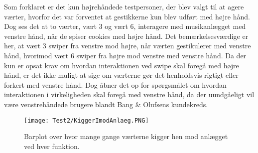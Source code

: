 Som forklaret er det kun højrehåndede testpersoner, der blev valgt til at agere værter, hvorfor det var forventet at gestikkerne kun blev udført med højre hånd. Dog ses det at to værter, vært 3 og vært 6, interagere med musikanlægget med venstre hånd, når de spiser cookies med højre hånd. Det bemærkelsesværdige er her, at vært 3 swiper fra venstre mod højre, når værten gestikulerer med venstre hånd, hvorimod vært 6 swiper fra højre mod venstre med venstre hånd. Da der kun er opsat krav om hvordan interaktionen ved swipe skal foregå med højre hånd, er det ikke muligt at sige om værterne gør det henholdsvis rigtigt eller forkert med venstre hånd. Dog åbner det op for spørgsmålet om hvordan interaktionen i virkeligheden skal foregå med venstre hånd, da der uundgåeligt vil være venstrehåndede brugere blandt Bang $\&$ Olufsens kundekreds.\blankline
%
\begin{figure}[H]
	\centering
	\texttt{[image: Test2/KiggerImodAnlaeg.PNG]}
	\caption{Barplot over hvor mange gange værterne kigger hen mod anlægget ved hver funktion.}
	\label{fig:KiggerImodAnlaeg}
\end{figure}
\noindent
% 
